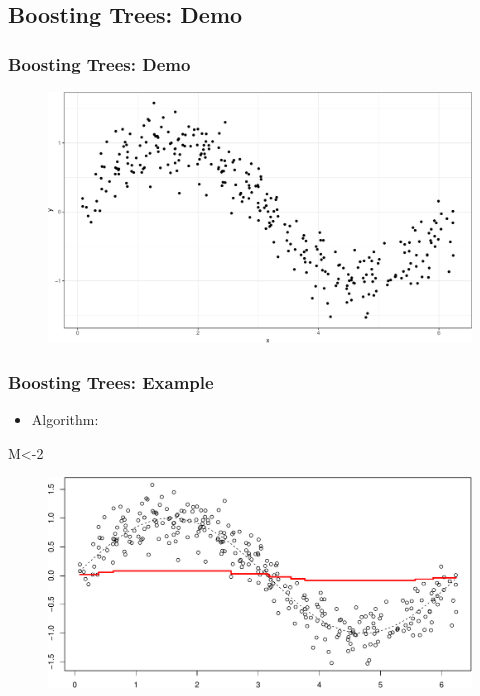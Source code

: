\documentclass[
  shownotes,
  xcolor={svgnames},
  hyperref={colorlinks,citecolor=DarkBlue,linkcolor=DarkRed,urlcolor=DarkBlue}
  , aspectratio=169]{beamer}
\newenvironment{Shaded}{\begin{snugshade}}{\end{snugshade}}
\newcommand{\DecValTok}[1]{\textcolor[rgb]{0.00,0.00,0.81}{#1}}
\newcommand{\NormalTok}[1]{#1}
\begin{document}
\subsection{Boosting Trees: Demo} 
\begin{frame}[fragile]
\frametitle{Boosting Trees: Demo}
\begin{figure}[H] \centering
            \captionsetup{justification=centering}
              \includegraphics[scale=0.5]{figures/unnamed-chunk-3-1.pdf}
 \end{figure}


 \end{frame}
\begin{frame}[fragile]
\frametitle{Boosting Trees: Example}

\begin{itemize}
\item Algorithm:
\end{itemize}

\begin{Shaded}
\begin{Highlighting}[]
\NormalTok{M\textless{}{-}}\DecValTok{2}
\end{Highlighting}
\end{Shaded}

\begin{figure}[H] \centering
            \captionsetup{justification=centering}
              \includegraphics[scale=0.5]{figures/unnamed-chunk-5-1.pdf}
 \end{figure}

 \end{frame}
\end{document}
